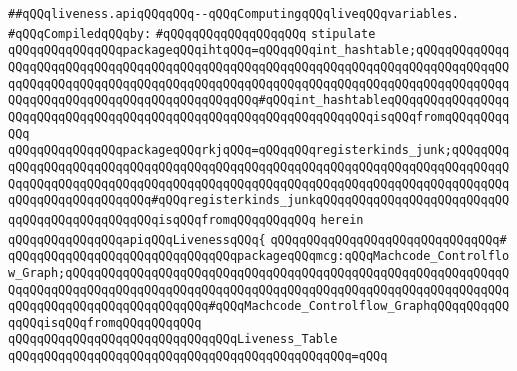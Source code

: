\label{src/lib/compiler/back/low/regor/liveness.api}
\verb|##qQQqliveness.apiqQQqqQQq--qQQqComputingqQQqliveqQQqvariables.|\newline
\newline
\verb|#qQQqCompiledqQQqby:|\newline
\verb|#qQQqqQQqqQQqqQQqqQQq|\newline
\newline
\verb|stipulate|\newline
\verb|qQQqqQQqqQQqqQQqpackageqQQqihtqQQq=qQQqqQQqint_hashtable;qQQqqQQqqQQqqQQqqQQqqQQqqQQqqQQqqQQqqQQqqQQqqQQqqQQqqQQqqQQqqQQqqQQqqQQqqQQqqQQqqQQqqQQqqQQqqQQqqQQqqQQqqQQqqQQqqQQqqQQqqQQqqQQqqQQqqQQqqQQqqQQqqQQqqQQqqQQqqQQqqQQqqQQqqQQqqQQqqQQqqQQqqQQq#qQQqint_hashtableqQQqqQQqqQQqqQQqqQQqqQQqqQQqqQQqqQQqqQQqqQQqqQQqqQQqqQQqqQQqqQQqqQQqisqQQqfromqQQqqQQqqQQq|\newline
\verb|qQQqqQQqqQQqqQQqpackageqQQqrkjqQQq=qQQqqQQqregisterkinds_junk;qQQqqQQqqQQqqQQqqQQqqQQqqQQqqQQqqQQqqQQqqQQqqQQqqQQqqQQqqQQqqQQqqQQqqQQqqQQqqQQqqQQqqQQqqQQqqQQqqQQqqQQqqQQqqQQqqQQqqQQqqQQqqQQqqQQqqQQqqQQqqQQqqQQqqQQqqQQqqQQqqQQqqQQq#qQQqregisterkinds_junkqQQqqQQqqQQqqQQqqQQqqQQqqQQqqQQqqQQqqQQqqQQqqQQqisqQQqfromqQQqqQQqqQQq|\newline
\verb|herein|\newline
\newline
\verb|qQQqqQQqqQQqqQQqapiqQQqLivenessqQQq{|\newline
\verb|qQQqqQQqqQQqqQQqqQQqqQQqqQQqqQQq#|\newline
\verb|qQQqqQQqqQQqqQQqqQQqqQQqqQQqqQQqpackageqQQqmcg:qQQqMachcode_Controlflow_Graph;qQQqqQQqqQQqqQQqqQQqqQQqqQQqqQQqqQQqqQQqqQQqqQQqqQQqqQQqqQQqqQQqqQQqqQQqqQQqqQQqqQQqqQQqqQQqqQQqqQQqqQQqqQQqqQQqqQQqqQQqqQQqqQQqqQQqqQQqqQQqqQQqqQQqqQQqqQQqqQQq#qQQqMachcode_Controlflow_GraphqQQqqQQqqQQqqQQqisqQQqfromqQQqqQQqqQQq|\newline
\newline
\verb|qQQqqQQqqQQqqQQqqQQqqQQqqQQqqQQqLiveness_Table|\newline
\verb|qQQqqQQqqQQqqQQqqQQqqQQqqQQqqQQqqQQqqQQqqQQqqQQq=qQQq|\newline
